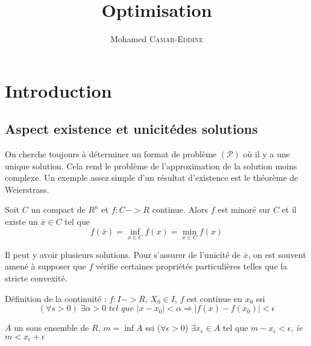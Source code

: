 \providecommand{\VarRectoVerso}{oneside}


%

\title{Optimisation}
\author{Mohamed \textsc{Camar-Eddine}}


\usepackage{amsmath}


\maketitle

\tableofcontents

\newpage{}

\section{Introduction}


	\subsection{Aspect \og existence et unicité\fg des solutions}
	
	On cherche toujours à déterminer un format de problème $(\mathcal{P})$ où il y a une unique solution. Cela rend le problème de l'approximation de la solution moins complexe. Un exemple assez simple d'un résultat d'existence est le théorème de Weierstrass.
	
	Soit $C$ un compact de $R^n$ et $f: C->R$ continue. Alors $f$ est minoré sur $C$ et il existe un $\bar{x} \in C$ tel que \[f(\bar{x}) = \inf_{x \in C} f(x) = \min_{x \in C} f(x)\]
	
	Il peut y avoir plusieurs solutions. Pour s'assurer de l'unicité de $\bar{x}$, on est souvent amené à supposer que $f$ vérifie certaines propriétés particulières telles que la stricte convexité.
	
	\begin{definition}
	Définition de la continuité :
	$f:I->R$, $X_0 \in I$, $f$ est continue en $x_0$ ssi \[ (\forall s>0) \;\exists \alpha >0 \textit{ tel que } |x-x_0| < \alpha \Rightarrow |f(x)-f(x_0)| < \epsilon \]
	\end{definition}
	
	$A$ un sous ensemble de $R$, $m = \inf A$ ssi ($\forall \epsilon>0$) $\exists x_\epsilon \in A$ tel que $m - x_\epsilon < \epsilon$, \textit{ie} $m < x_\epsilon + \epsilon$
	
